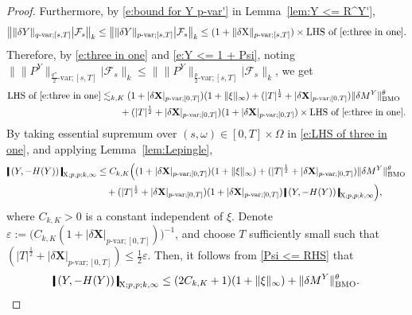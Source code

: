 \documentclass[11pt,reqno]{amsart}
\numberwithin{equation}{section}
\newcommand{\shortthickbar}{%
  \vcenter{\hbox{\rule{1.8pt}{2.2ex}}}%
}
\newcommand{\thicknm}[1]{%
  \mathopen{\shortthickbar}%
  \mkern4mu #1 \mkern4mu%
  \mathclose{\shortthickbar}%
}
\begin{document}
\begin{proof}
Furthermore, by \eqref{e:bound for Y p-var'} in Lemma~\ref{lem:Y <= R^Y'}, 
\begin{equation}\label{e:Y <= 1 + Psi}
\big\| \|\delta Y\|_{q\text{-var};[s,T]} \big| \mathcal F_{s} \big\|_{k} \le \big\| \|\delta Y\|_{p\text{-var};[s,T]} \big| \mathcal F_{s} \big\|_{k}\le (1 + \|\delta \mathrm X\|_{p\text{-}\mathrm{var};[s,T]}) \times \text{LHS of \eqref{e:three in one}}.
\end{equation}
Therefore, by \eqref{e:three in one} and \eqref{e:Y <= 1 + Psi}, noting $\big\| \|P^Y\|_{\frac{q''}{2}\text{-}\mathrm{var};[s,T]} \big| \mathcal F_{s}\big\|_{k} \le \big\| \|P^Y\|_{\frac{p}{2}\text{-}\mathrm{var};[s,T]} \big| \mathcal F_{s}\big\|_{k}$, we get
\begin{equation}\label{e:LHS of three in one}
\begin{aligned}
\text{LHS of \eqref{e:three in one}}&\lesssim_{k,K}  (1 + |\delta \mathbf X|_{p\text{-}\mathrm{var};[0,T]}) (1 + \|\xi\|_{\infty}) + (|T|^{\frac{1}{2}} +  |\delta \mathbf X|_{p\text{-}\mathrm{var};[0,T]})\|\delta M^{Y}\|^{\theta}_{\mathrm{BMO}}\\
&\qquad + (|T|^{\frac{1}{2}} + |\delta \mathbf X|_{p\text{-}\mathrm{var};[0,T]}) (1 + |\delta \mathbf X|_{p\text{-}\mathrm{var};[0,T]}) \times \text{LHS of \eqref{e:three in one}}.
\end{aligned}
\end{equation}
By taking essential supremum over $(s,\omega)\in [0,T]\times \Omega$ in \eqref{e:LHS of three in one}, and applying Lemma~\ref{lem:Lepingle},
\begin{align} \nonumber
\thicknm{(Y,-H(Y))}_{\mathrm X;p,p;k,\infty}
&\le C_{k,K} \Big((1 + |\delta \mathbf X|_{p\text{-}\mathrm{var};[0,T]}) (1 + \|\xi\|_{\infty}) + (|T|^{\frac{1}{2}} +  |\delta \mathbf X|_{p\text{-}\mathrm{var};[0,T]})\|\delta M^{Y}\|^{\theta}_{\mathrm{BMO}}\\ \label{Psi <= RHS}
&\quad + (|T|^{\frac{1}{2}} +  |\delta \mathbf X|_{p\text{-}\mathrm{var};[0,T]}) (1 + |\delta \mathbf X|_{p\text{-}\mathrm{var};[0,T]}) \,  \thicknm{(Y,-H(Y))}_{\mathrm X;p,p;k,\infty} \Big),
\end{align}
where $C_{k,K}>0$ is a constant independent of $\xi$. Denote $\varepsilon := \big(C_{k,K}(1 + |\delta \mathbf X|_{p\text{-}\mathrm{var};[0,T]}) \big)^{-1}$, and choose $T$ sufficiently small such that $ (|T|^{\frac{1}{2}} + |\delta\mathbf X|_{p\text{-}\mathrm{var};[0,T]}) \le \frac{1}{2} \varepsilon$. Then, it follows from \eqref{Psi <= RHS} that 
\begin{equation}\label{e:Psi <= M}
\thicknm{(Y,-H(Y))}_{\mathrm X;p,p;k,\infty}\le (2 C_{k,K} +1) (1 + \|\xi\|_{\infty}) + \|\delta M^{Y}\|^{\theta}_{\mathrm{BMO}}.
\end{equation}


\end{proof}
\end{document}
